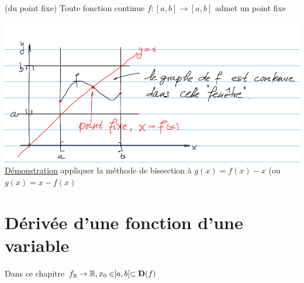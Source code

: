 \documentclass[12pt,a4paper]{article}
\begin{document}
{\begin{boite}
\Theoreme (du point fixe) Toute fonction continue $f:[a,b] \to [a,b]$ admet un point fixe
\end{boite}
\includegraphics[scale=0.5]{illustrations_Analyse/point_fixe}\\
\underline{Démonstration} appliquer la méthode de bissection à $g(x) = f(x) -x$ (ou $g(x) = x -f(x)$

\section{Dérivée d'une fonction d'une variable}
\setcounter{equation}{0}
Dans ce chapitre $f_ \rtor, x_0 \in ]a,b[ \subset \mathbf{D}(f)$\\
}
\end{document}
